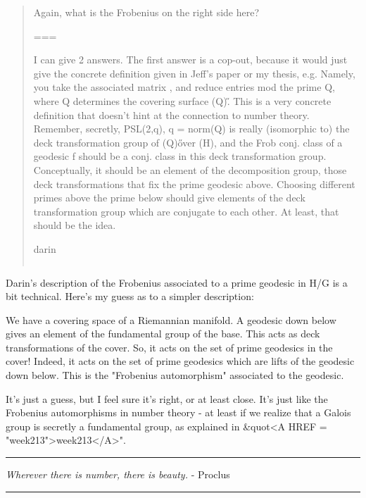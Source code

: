 \begin{quote}
   Again, what is the Frobenius on the right side here?

===

I can give 2 answers. The first answer is a cop-out, because it would
just give the concrete definition given in Jeff's paper or my thesis,
e.g. Namely, you take the associated matrix \gamma , and reduce entries
mod the prime Q, where Q determines the covering surface \Gamma (Q)\H.
This is a very concrete definition that doesn't hint at the connection
to number theory. Remember, secretly, PSL(2,q), q = norm(Q) is really
(isomorphic to) the deck transformation group of \Gamma (Q)\H over
\Gamma (H), and the Frob conj. class of a geodesic f should be a conj.
class in this deck transformation group. Conceptually, it should be an
element of the decomposition group, those deck transformations that fix
the prime geodesic above. Choosing different primes above the prime
below should give elements of the deck transformation group which are
conjugate to each other. At least, that should be the idea.

darin

$$
    
\end{quote}

Darin's description of the Frobenius associated to a prime
geodesic in H/G is a bit technical.  Here's my guess as to a simpler
description:

We have a covering space of a Riemannian manifold.  A geodesic down
below gives an element of the fundamental group of the base.  This
acts as deck transformations of the cover.  So, it acts on the set
of prime geodesics in the cover!  Indeed, it acts on the set of
prime geodesics which are lifts of the geodesic down below.
This is the "Frobenius automorphism" associated to the
geodesic.

It's just a guess, but I feel sure it's right, or at least
close.  It's just like the Frobenius automorphisms in number
theory - at least if we realize that a Galois group is secretly
a fundamental group, as explained in &quot<A HREF = "week213">week213</A>".


 



\par\noindent\rule{\textwidth}{0.4pt}
\emph{Wherever there is number, there is beauty.} - Proclus

\par\noindent\rule{\textwidth}{0.4pt}


